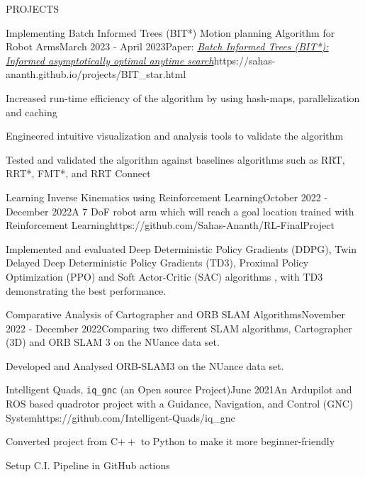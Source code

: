 \documentclass{resume} %
\begin{document}
\begin{rSection}{PROJECTS}
	\begin{rProjExpDetails}{Implementing Batch Informed Trees (BIT*) Motion planning Algorithm for Robot Arms}{}{March 2023 - April 2023}{Paper: \href{https://journals.sagepub.com/doi/pdf/10.1177/0278364919890396}{\textit{Batch Informed Trees (BIT*): Informed asymptotically optimal anytime search}}}{https://sahas-ananth.github.io/projects/BIT_star.html}{}
		\item Increased run-time efficiency of the algorithm by using hash-maps, parallelization and caching
		\item Engineered intuitive visualization and analysis tools to validate the algorithm
		\item Tested and validated the algorithm against baselines algorithms such as RRT, RRT*, FMT*, and RRT Connect
	\end{rProjExpDetails}

	\begin{rProjExpDetails}{Learning Inverse Kinematics using Reinforcement Learning}{}{October 2022 - December 2022}{A 7 DoF robot arm which will reach a goal location trained with Reinforcement Learning}{https://github.com/Sahas-Ananth/RL-FinalProject}{}
		\item Implemented and evaluated Deep Deterministic Policy Gradients (DDPG), Twin Delayed Deep Deterministic Policy Gradients (TD3), Proximal Policy Optimization (PPO) and Soft Actor-Critic (SAC) algorithms , with TD3 demonstrating the best performance.
	\end{rProjExpDetails}

	\begin{rProjExpDetails}{Comparative Analysis of Cartographer and ORB SLAM Algorithms}{}{November 2022 - December 2022}{Comparing two different SLAM algorithms, Cartographer (3D) and ORB SLAM 3 on the NUance data set.}{}{}
		\item Developed and Analysed ORB-SLAM3 on the NUance data set.
	\end{rProjExpDetails}

	\begin{rProjExpDetails}{Intelligent Quads, \texttt{iq\_gnc} (an Open source Project)}{}{June 2021}{An Ardupilot and ROS based quadrotor project with a Guidance, Navigation, and Control (GNC) System}{https://github.com/Intelligent-Quads/iq_gnc}{}
		\item Converted project from C$++$ to Python to make it more beginner-friendly
		\item Setup C.I. Pipeline in GitHub actions
	\end{rProjExpDetails}


\end{rSection}
\end{document}
